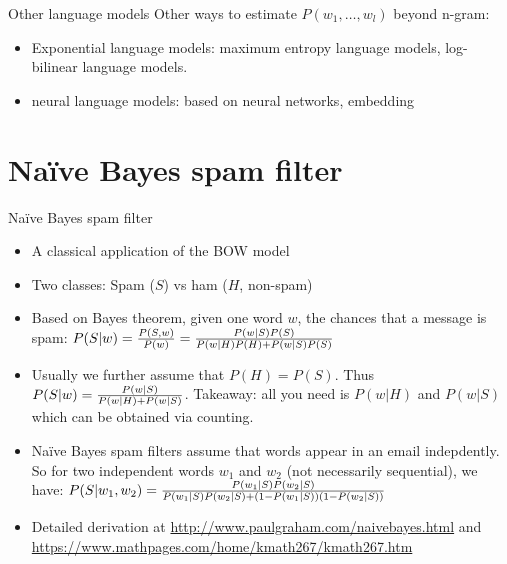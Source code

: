 \documentclass[11pt]{beamer}
\begin{document}
\begin{frame}{Other language models}
Other ways to estimate $P(w_1, \dots, w_l)$ beyond n-gram: 
\begin{itemize}
 \item Exponential language models: maximum entropy language models, log-bilinear language models. 
 \item neural language models: based on neural networks, embedding 
\end{itemize}
\end{frame}

\section{Na\"ive Bayes spam filter}
\begin{frame}{Na\"ive Bayes spam filter}
  \begin{itemize}[<+->]
    \item A classical application of the BOW model
    \item Two classes: Spam ($S$) vs ham ($H$, non-spam)
    \item Based on Bayes theorem, given one word $w$, the chances that a message is spam: 
      $P(S|w)={P(S, w)\over P(w)} = { P(w|S)P(S) \over P(w|H)P(H)+P(w|S)P(S)} $
    \item Usually we further assume that $P(H)=P(S)$. Thus $P(S|w)= { P(w|S) \over P(w|H)+P(w|S)}$. Takeaway: all you need is $P(w|H)$ and $P(w|S)$ which can be obtained via counting. 
    \item Na\"ive Bayes spam filters assume that  words appear in an email indepdently. So for two independent words $w_1$ and $w_2$ (not necessarily sequential), we have: 
 $P(S|w_1, w_2)={P(w_1|S) P(w_2|S) \over P(w_1|S) P(w_2|S) + (1-P(w_1|S)) (1- P(w_2|S))}$ 
 \item Detailed derivation at \url{http://www.paulgraham.com/naivebayes.html} and \url{https://www.mathpages.com/home/kmath267/kmath267.htm}

  \end{itemize}
  
\end{frame}
\end{document}
